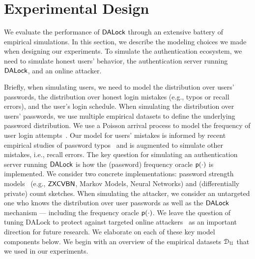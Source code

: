 \vspace*{-\baselineskip}
\section{Experimental Design} %

We evaluate the performance of $\mathsf{DALock}$ through an extensive battery of empirical simulations. In this section, we describe the modeling choices we made when designing our experiments. To simulate the authentication ecosystem, we need to simulate honest users' behavior, the authentication server running $\mathsf{DALock}$, and an online attacker. 

Briefly, when simulating users, we need to model the distribution over users’ passwords, the distribution over honest login mistakes (e.g., typos or recall errors), and the user's login schedule. When simulating the distribution over users’ passwords, we use multiple empirical datasets to define the underlying password distribution. We use a Poisson arrival process to model the frequency of user login attempts~\cite{AC:BloBluDat13}. Our model for users’ mistakes is informed by recent empirical studies of password typos~\cite{CCS:CWPCR17,SP:CAAJR16} and is augmented to simulate other mistakes, i.e., recall errors.  The key question for simulating an authentication server running $\mathsf{DALock}$ is how the (password) frequency oracle $\textsf{p}(\cdot)$ is implemented. We consider two concrete implementations: password strength models~\cite{ USENIX:Wheeler16,USENIX:USBCCKKMMS15,USENIX:MUSKBCC16} (e.g., $\mathsf{ZXCVBN}$, Markov Models, Neural Networks) and (differentially private) count sketches. When simulating the attacker, we consider an untargeted one who knows the distribution over user passwords as well as the $\mathsf{DALock}$ mechanism --- including the frequency oracle $\textsf{p}(\cdot)$. We leave the question of tuning DALock to protect against targeted online attackers~\cite{CCS:WZWYH16} as an important direction for future research. We elaborate on each of these key model components below.  We begin  with an overview of the empirical datasets $\mathcal{D}_{{\mathcal{U}}}$ that we used in our experiments.

\vspace*{-\baselineskip}
